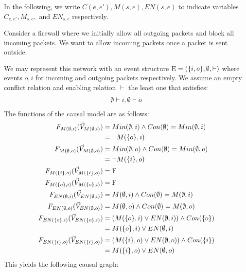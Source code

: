 In the following, we write $C(e,e'),M(s,e),EN(s,e)$ to indicate variables
$C_{e,e'},M_{s,e},$ and $EN_{s,e}$ respectively.
\begin{example}
    Consider a firewall where we initially allow all outgoing packets and block all incoming packets.
    We want to allow incoming packets once a packet is sent outside.
    \begin{center}
    \end{center}
    We may represent this network with an event structure
    $\mathrm{E} = (\{i,o\},\emptyset,\vdash)$ where events $o,i$ for incoming
    and outgoing packets respectively.
    We assume an empty conflict relation and enabling relation
    $\vdash$ the least one that satisfies:
    \begin{align*}
        \emptyset \vdash i, \emptyset \vdash o
    \end{align*}
    The functions of the causal model are as follows:
    \begin{align*}
        F_{M(\emptyset,i)}(\vec V_{M(\emptyset,i)})     & = Min(\emptyset,i) \wedge Con(\emptyset) = Min(\emptyset,i)   \\
                        & = \neg M(\{o\},i)                        \\
        F_{M(\emptyset,o)}(\vec V_{M(\emptyset,o)})     & = Min(\emptyset,o) \wedge Con(\emptyset) =  Min(\emptyset,o)  \\
                        & = \neg M(\{i\},o)                        \\
        F_{M(\{i\},o)}(\vec V_{M(\{i\},o)})  & = \mathrm{F}                                     \\
        F_{M(\{o\},i)}(\vec V_{M(\{o\},i)})  & = \mathrm{F}                                     \\
        F_{EN(\emptyset,i)}(\vec V_{EN(\emptyset,i)})    & = M(\emptyset,i) \wedge Con(\emptyset) = M(\emptyset,i)       \\
        F_{EN(\emptyset,o)}(\vec V_{EN(\emptyset,o)})    & = M(\emptyset,o) \wedge Con(\emptyset) = M(\emptyset,o)       \\
        F_{EN(\{o\},i)}(\vec V_{EN(\{o\},i)}) & =
        \left( M(\{o\},i) \vee EN(\emptyset,i)  \right) \wedge Con(\{o\}) \\
                        & = M(\{o\},i) \vee EN(\emptyset,i)               \\
        F_{EN(\{i\},o)}(\vec V_{EN(\{i\},o)}) & =
        \left( M(\{i\},o) \vee EN(\emptyset,o) \right)
        \wedge Con(\{i\})                                          \\
                        & = M(\{i\},o) \vee EN(\emptyset,o)
    \end{align*}
    This yields the following causal graph:
    \begin{center}
\end{center}
\end{example}
